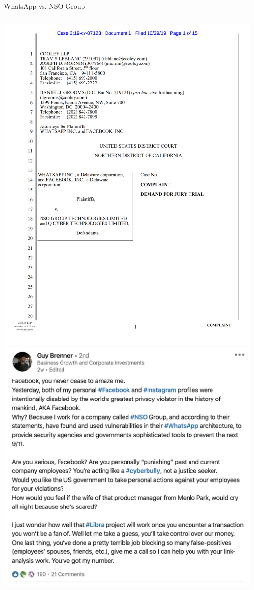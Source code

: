 \documentclass[nobackground,dvipsnames,table]{beamer}
\begin{document}
\begin{frame}{WhatsApp vs. NSO Group}
    \begin{columns}
            \includegraphics[width=\textwidth]{whatsapp-vs-nso-court-doc}
            \includegraphics[width=\textwidth]{nso-rant}
    \end{columns}
\end{frame}
\end{document}
